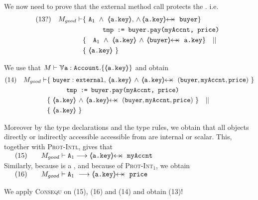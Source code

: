 \begin{proofO}

 

We now need to prove that the external method call  protects the . i.e.
\begin{align*}
\text{(13?)} \ \ \ M_{good} \vdash & \{ \ \Alocalsb \   \wedge\    {\inside{\prg{a.key}}},\, \wedge\, \protectedFrom {\prg{a.key}} {\prg{buyer}}  \} \\
		  		& \SPT  \prg{tmp := buyer.pay(myAccnt, price)}\ \\  
		  		& \{ \ \ \ \Alocalsb \ \wedge\ {\inside{\prg{a.key}}} \, \wedge\, \protectedFrom{\prg{buyer}} {\prg{a.key}} \} \ \ \  || \ \ \  \\
		  		&   \{ \   {\inside{\prg{a.key}}}\  \}
\end{align*}
\normalsize

We use that $M \vdash \TwoStatesN  {\prg{a}:\prg{Account}}  {\inside{\prg{a.key}}}$
 and  obtain
 \\
 \small
\begin{align*}
\text{(14)} \ \ \ M_{good} \vdash & \{ \ \prg{buyer}:\prg{external},\,  {\inside{\prg{a.key}}} \, \wedge\, 
\protectedFrom {\prg{a.key}} {(\prg{buyer},\prg{myAccnt},\prg{price})} \  \} \\
		  		& \SPT  \prg{tmp := buyer.pay(myAccnt, price)}\ \\  
		  		& \{ \ \inside{\prg{a.key}} \, \wedge\, 
\protectedFrom {\prg{a.key}} {(\prg{buyer},\prg{myAccnt},\prg{price})}\ \} \ \ \  || \ \ \  \\
		  		&   \{ \   {\inside{\prg{a.key}}}\  \}
\end{align*}
\normalsize 
 
 
 Moreover by the type declarations and the type rules, we obtain that all objects directly or indirectly accessible accessible from  are internal or scalar.
 This, together with  \textsc{Prot-Intl}, gives that
\\
$
\begin{array}{llll}
& (15) & & M_{good} \vdash \Alocalsb   \longrightarrow \protectedFrom {\prg{a.key}} {\prg{myAccnt}} 
\end{array}
$
\\
Similarly, because  is a , and because of \textsc{Prot-Int}$_1$, we obtain 
\\
$
\begin{array}{llll}
& (16) & & M_{good} \vdash \Alocalsb \   \longrightarrow \protectedFrom {\prg{a.key}} {\prg{price}} 
\end{array}
$
 

We apply {\textsc{Consequ}} on (15), (16) and (14) and obtain (13)!

\normalsize


\end{proofO}

